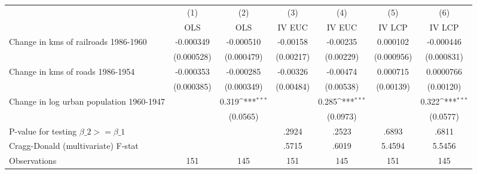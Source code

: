 {
\def\sym#1{\ifmmode^{#1}\else\(^{#1}\)\fi}
\begin{tabular}{l*{6}{c}}
\hline\hline
                &\multicolumn{1}{c}{(1)}&\multicolumn{1}{c}{(2)}&\multicolumn{1}{c}{(3)}&\multicolumn{1}{c}{(4)}&\multicolumn{1}{c}{(5)}&\multicolumn{1}{c}{(6)}\\
                &\multicolumn{1}{c}{OLS}&\multicolumn{1}{c}{OLS}&\multicolumn{1}{c}{IV EUC}&\multicolumn{1}{c}{IV EUC}&\multicolumn{1}{c}{IV LCP}&\multicolumn{1}{c}{IV LCP}\\
\hline
Change in kms of railroads 1986-1960&-0.000349         &-0.000510         & -0.00158         & -0.00235         & 0.000102         &-0.000446         \\
                &(0.000528)         &(0.000479)         &(0.00217)         &(0.00229)         &(0.000956)         &(0.000831)         \\
[1em]
Change in kms of roads 1986-1954&-0.000353         &-0.000285         & -0.00326         & -0.00474         & 0.000715         &0.0000766         \\
                &(0.000385)         &(0.000349)         &(0.00484)         &(0.00538)         &(0.00139)         &(0.00120)         \\
[1em]
Change in log urban population 1960-1947&                  &    0.319\sym{***}&                  &    0.285\sym{***}&                  &    0.322\sym{***}\\
                &                  & (0.0565)         &                  & (0.0973)         &                  & (0.0577)         \\
\hline
P-value for testing $\beta\_{2} >= \beta\_{1}$&                  &                  &    .2924         &    .2523         &    .6893         &    .6811         \\
Cragg-Donald (multivariate) F-stat&                  &                  &    .5715         &    .6019         &   5.4594         &   5.5456         \\
Observations    &      151         &      145         &      151         &      145         &      151         &      145         \\
\hline\hline
\end{tabular}
}

